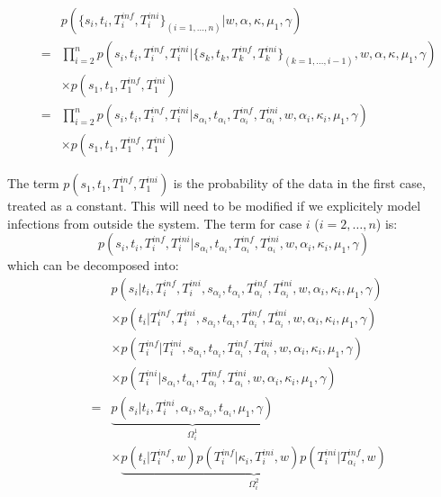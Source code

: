 \documentclass[10pt]{article}
\begin{document}
\begin{eqnarray}
& & p(\{s_i, t_i, T_i^{inf},T_i^{ini}\}_{(i=1,\ldots,n)}|  w, \alpha, \kappa, \mu_1, \gamma) \\
& = & \prod_{i=2}^n p(s_i, t_i, T_i^{inf},T_i^{ini} | \{s_k, t_k, T_k^{inf},T_k^{ini} \}_{(k=1,\ldots,i-1)}, w, \alpha, \kappa, \mu_1, \gamma) \nonumber \\ 
& & \times p(s_1, t_1, T_1^{inf}, T_1^{ini})\\
& = & \prod_{i=2}^n p(s_i, t_i, T_i^{inf},T_i^{ini}| s_{\alpha_i}, t_{\alpha_i}, T_{\alpha_i}^{inf}, T_{\alpha_i}^{ini},  w, \alpha_i, \kappa_i, \mu_1, \gamma) \nonumber \\
& & \times p(s_1, t_1, T_1^{inf}, T_1^{ini})
\end{eqnarray}


The term $p(s_1, t_1, T_1^{inf}, T_1^{ini})$ is the probability of the data in the first case, treated as a constant.
This will need to be modified if we explicitely model infections from outside the system.
The term for case $i$ ($i=2,\ldots,n$) is:
\begin{equation}
 p(s_i, t_i, T_i^{inf},T_i^{ini}| s_{\alpha_i}, t_{\alpha_i}, T_{\alpha_i}^{inf}, T_{\alpha_i}^{ini},  w, \alpha_i, \kappa_i, \mu_1, \gamma )
\end{equation}
which can be decomposed into:
\begin{eqnarray}
& & p(s_i | t_i, T_i^{inf}, T_i^{ini}, s_{\alpha_i}, t_{\alpha_i}, T_{\alpha_i}^{inf}, T_{\alpha_i}^{ini},  w, \alpha_i, \kappa_i, \mu_1, \gamma) \nonumber \\
& &  \times  p(t_i | T_i^{inf}, T_i^{ini}, s_{\alpha_i}, t_{\alpha_i}, T_{\alpha_i}^{inf}, T_{\alpha_i}^{ini},  w, \alpha_i, \kappa_i, \mu_1, \gamma) \nonumber \\
& & \times  p(T_i^{inf}| T_i^{ini}, s_{\alpha_i}, t_{\alpha_i}, T_{\alpha_i}^{inf}, T_{\alpha_i}^{ini},  w, \alpha_i, \kappa_i, \mu_1, \gamma) \nonumber \\
& & \times  p(T_i^{ini}| s_{\alpha_i}, t_{\alpha_i}, T_{\alpha_i}^{inf}, T_{\alpha_i}^{ini},  w, \alpha_i, \kappa_i, \mu_1, \gamma) \\
& = & 
\underbrace{p(s_i | t_i, T_i^{ini}, \alpha_i, s_{\alpha_i}, t_{\alpha_i}, \mu_1, \gamma)}_{\Omega_i^1} \nonumber \\
& &  \times  \underbrace{p(t_i | T_i^{inf}, w) 
 p(T_i^{inf}| \kappa_i, T_i^{ini}, w)
 p(T_i^{ini}| T_{\alpha_i}^{inf}, w)}_{\Omega_i^2}
\end{eqnarray}
\end{document}
